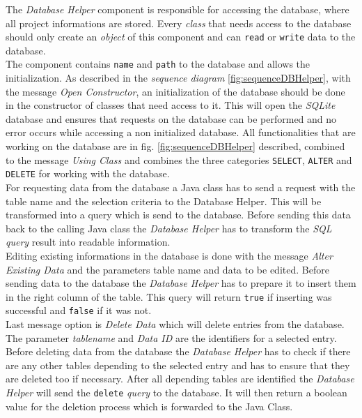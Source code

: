 The \textit{Database Helper} component is responsible for accessing the database, where all project informations are stored. Every \textit{class} that needs access to the database should only create an \textit{object} of this component and can \texttt{read} or \texttt{write} data to the database.\\
The component contains \texttt{name} and \texttt{path} to the database and allows the initialization. As described in the \textit{sequence diagram} \ref{fig:sequenceDBHelper}, with the message \textit{Open Constructor}, an initialization of the database should be done in the constructor of classes that need access to it. This will open the \textit{SQLite} database and ensures that requests on the database can be performed and no error occurs while accessing a non initialized database. All functionalities that are working on the database are in fig. \ref{fig:sequenceDBHelper} described, combined to the message \textit{Using Class} and combines the three categories \texttt{SELECT}, \texttt{ALTER} and \texttt{DELETE} for working with the database.\\ 
For requesting data from the database a Java class has to send a request with the table name and the selection criteria to the Database Helper. This will be transformed into a query which is send to the database. Before sending this data back to the calling Java class the \textit{Database Helper} has to transform the \textit{SQL} \textit{query} result into readable information.\\
Editing existing informations in the database is done with the message \textit{Alter Existing Data} and the parameters table name and data to be edited. Before sending data to the database the \textit{Database Helper} has to prepare it to insert them in the right column of the table. This query will return \texttt{true} if inserting was successful and \texttt{false} if it was not.\\
Last message option is \textit{Delete Data} which will delete entries from the database. The parameter \textit{tablename} and \textit{Data ID} are the identifiers for a selected entry. Before deleting data from the database the \textit{Database Helper} has to check if there are any other tables depending to the selected entry and has to ensure that they are deleted too if necessary. After all depending tables are identified the \textit{Database Helper} will send the \texttt{delete} \textit{query} to the database. It will then return a boolean value for the deletion process which is forwarded to the Java Class.
